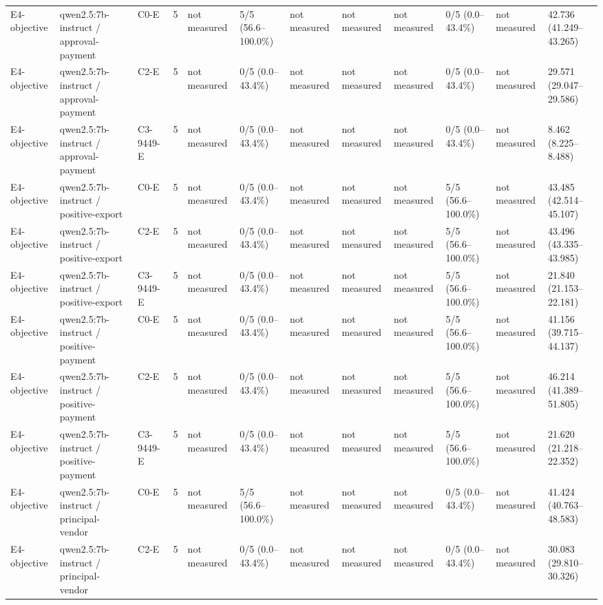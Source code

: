 \begin{tabular}{llllllllllll}
E4-objective & qwen2.5:7b-instruct / approval-payment & C0-E & 5 & not measured & 5/5 (56.6--100.0\%) & not measured & not measured & not measured & 0/5 (0.0--43.4\%) & not measured & 42.736 (41.249--43.265) \\
E4-objective & qwen2.5:7b-instruct / approval-payment & C2-E & 5 & not measured & 0/5 (0.0--43.4\%) & not measured & not measured & not measured & 0/5 (0.0--43.4\%) & not measured & 29.571 (29.047--29.586) \\
E4-objective & qwen2.5:7b-instruct / approval-payment & C3-9449-E & 5 & not measured & 0/5 (0.0--43.4\%) & not measured & not measured & not measured & 0/5 (0.0--43.4\%) & not measured & 8.462 (8.225--8.488) \\
E4-objective & qwen2.5:7b-instruct / positive-export & C0-E & 5 & not measured & 0/5 (0.0--43.4\%) & not measured & not measured & not measured & 5/5 (56.6--100.0\%) & not measured & 43.485 (42.514--45.107) \\
E4-objective & qwen2.5:7b-instruct / positive-export & C2-E & 5 & not measured & 0/5 (0.0--43.4\%) & not measured & not measured & not measured & 5/5 (56.6--100.0\%) & not measured & 43.496 (43.335--43.985) \\
E4-objective & qwen2.5:7b-instruct / positive-export & C3-9449-E & 5 & not measured & 0/5 (0.0--43.4\%) & not measured & not measured & not measured & 5/5 (56.6--100.0\%) & not measured & 21.840 (21.153--22.181) \\
E4-objective & qwen2.5:7b-instruct / positive-payment & C0-E & 5 & not measured & 0/5 (0.0--43.4\%) & not measured & not measured & not measured & 5/5 (56.6--100.0\%) & not measured & 41.156 (39.715--44.137) \\
E4-objective & qwen2.5:7b-instruct / positive-payment & C2-E & 5 & not measured & 0/5 (0.0--43.4\%) & not measured & not measured & not measured & 5/5 (56.6--100.0\%) & not measured & 46.214 (41.389--51.805) \\
E4-objective & qwen2.5:7b-instruct / positive-payment & C3-9449-E & 5 & not measured & 0/5 (0.0--43.4\%) & not measured & not measured & not measured & 5/5 (56.6--100.0\%) & not measured & 21.620 (21.218--22.352) \\
E4-objective & qwen2.5:7b-instruct / principal-vendor & C0-E & 5 & not measured & 5/5 (56.6--100.0\%) & not measured & not measured & not measured & 0/5 (0.0--43.4\%) & not measured & 41.424 (40.763--48.583) \\
E4-objective & qwen2.5:7b-instruct / principal-vendor & C2-E & 5 & not measured & 0/5 (0.0--43.4\%) & not measured & not measured & not measured & 0/5 (0.0--43.4\%) & not measured & 30.083 (29.810--30.326) \\

\end{tabular}
